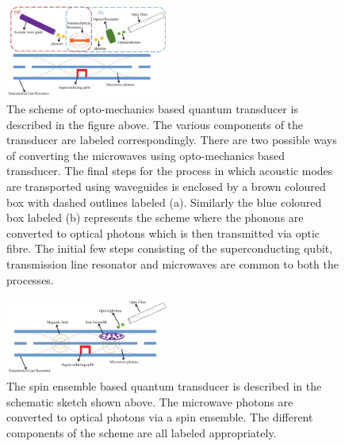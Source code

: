\documentclass[twocolumn, aps, rmp, amsmath, amssymb, nofootinbib, superscriptaddress, longbibliography, floatfix, table-of-contents, eqsecnum]{revtex4-1}
\begin{document}
\begin{figure}[!htbp]
\includegraphics[width=0.475\textwidth]{transducer_scheme_1}
\caption{The scheme of opto-mechanics based quantum transducer is described in the figure above. The various components of the transducer are labeled correspondingly. There are two possible ways of converting the microwaves using opto-mechanics based transducer. The final steps for the process in which acoustic modes are transported using waveguides is enclosed by a brown coloured box with dashed outlines labeled (a). Similarly the blue coloured box labeled (b) represents the scheme where the phonons are converted to optical photons which is then transmitted via optic fibre. The initial few steps consisting of the superconducting qubit, transmission line resonator and microwaves are common to both the processes.}
\end{figure}

\begin{figure}[t]
\includegraphics[width=0.475\textwidth]{transducer_scheme_2}
\caption{The spin ensemble based quantum transducer is described in the schematic sketch shown above. The microwave photons are converted to optical photons via a spin ensemble. The different components of the scheme are all labeled appropriately. }
\end{figure}


 
\end{document}
